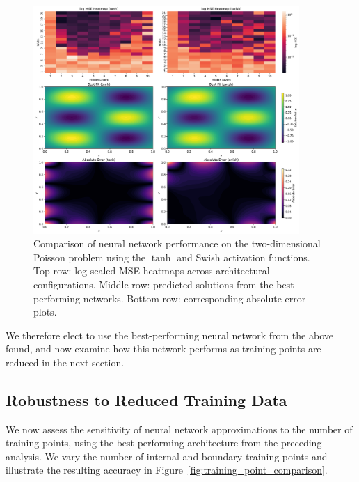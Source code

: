 \begin{figure}[htbp]
    \centering
    \includegraphics[width=0.9\textwidth]{graphics/pde_poisson_architecture_comparison.png}
    \caption{Comparison of neural network performance on the two-dimensional Poisson problem using the 
    $\tanh$ and Swish activation functions. Top row: log-scaled MSE heatmaps across architectural 
    configurations. Middle row: predicted solutions from the best-performing networks. Bottom row: 
    corresponding absolute error plots.}
    \label{fig:pde_comparison}
\end{figure}

We therefore elect to use the best-performing neural network from the above found, and now 
examine how this network performs as training points are reduced in the next section.

\subsection{Robustness to Reduced Training Data}

We now assess the sensitivity of neural network approximations to the number of training points, 
using the best-performing architecture from the preceding analysis. We vary the number of internal 
and boundary training points and illustrate the resulting accuracy in 
Figure~\ref{fig:training_point_comparison}.

